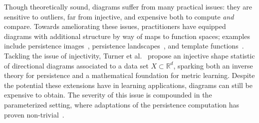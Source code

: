 \documentclass[10pt]{article}
\numberwithin{equation}{section}
\newcommand{\+}{%
	\raisebox{0.18ex}{\scaleobj{0.55}{+}}
}
\theoremstyle{definition}
\theoremstyle{definition}
\newcommand\numberthis{\addtocounter{equation}{1}\tag{\theequation}}
\begin{document}
Though theoretically sound, diagrams suffer from many practical issues: they are sensitive to outliers, far from injective, and expensive both to compute \emph{and} compare. 
Towards ameliorating these issues, practitioners have equipped diagrams with additional structure by way of maps to function spaces; examples include persistence images~\cite{adams2017persistence}, persistence landscapes~\cite{bubenik2015statistical}, and template functions~\cite{perea2022approximating}. 
Tackling the issue of injectivity, Turner et al.~\cite{turner2014persistent} propose an injective shape statistic of directional diagrams associated to a data set $X \subset \mathbb{R}^d$,  
sparking both an inverse theory for persistence and a mathematical foundation for metric learning.  
Despite the potential these extensions have in learning applications,
diagrams can still be expensive to obtain. The severity of this issue is compounded in the parameterized setting, where adaptations of the persistence computation has proven non-trivial~\cite{piekenbrock2021move}.
 
\end{document}
